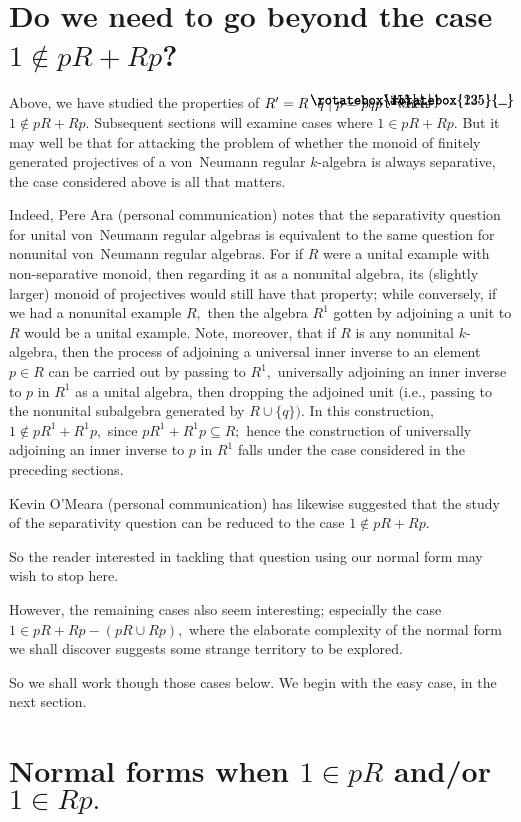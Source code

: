 \documentclass{amsart}
\DeclareRobustCommand{\lang}{\begin{picture}(5,7)
\put(1.2,2.5){\rotatebox{45}{\line(1,0){6.0}}}
\put(1.2,2.5){\rotatebox{315}{\line(1,0){6.0}}}
\end{picture}\kern.16em}
\DeclareRobustCommand{\rang}{\kern.1em\begin{picture}(5,7)
\put(.1,2.5){\rotatebox{135}{\line(1,0){6.0}}}
\put(.1,2.5){\rotatebox{225}{\line(1,0){6.0}}}
\end{picture}}
\begin{document}
\section{Do we need to go beyond the case $1\notin pR+Rp$?}\label{S.enough?}

Above, we have studied the properties of
$R'=R\lang q\mid p=pqp\rang$ when $1\notin pR+Rp.$
Subsequent sections will examine cases where $1\in pR+Rp.$
But it may well be that for attacking the problem of
whether the monoid of finitely generated projectives of
a von~Neumann regular $\!k\!$-algebra is always separative,
the case considered above is all that matters.

Indeed, Pere Ara (personal communication) notes that the
separativity question for unital von~Neumann regular algebras
is equivalent to the same question for nonunital
von~Neumann regular algebras.
For if $R$ were a unital example with non-separative monoid, then
regarding it as a nonunital algebra, its (slightly larger) monoid of
projectives would still have that property; while conversely,
if we had a nonunital example $R,$ then the algebra
$R^1$ gotten by adjoining a unit to $R$ would be a unital example.
Note, moreover, that if $R$ is any nonunital $\!k\!$-algebra, then the
process of adjoining a universal inner inverse to an element $p\in R$
can be carried out by passing to $R^1,$ universally adjoining an inner
inverse to $p$ in $R^1$ as a unital algebra,
then dropping the adjoined unit (i.e., passing to the
nonunital subalgebra generated by $R\cup\{q\}).$
In this construction, $1\notin pR^1 + R^1p,$
since $pR^1 + R^1p\subseteq R;$ hence the construction of
universally adjoining an inner inverse to $p$ in $R^1$
falls under the case considered in the preceding sections.

Kevin O'Meara (personal communication) has likewise suggested
that the study of the separativity
question can be reduced to the case $1\notin pR+Rp.$

So the reader interested in tackling that question using
our normal form may wish to stop here.

However, the remaining cases also seem interesting; especially
the case $1\in pR+Rp-(pR\cup Rp),$ where the elaborate complexity of
the normal form we shall discover suggests some strange
territory to be explored.

So we shall work though those cases below.
We begin with the easy case, in the next section.

\section{Normal forms when $1\in pR$ and/or $1\in Rp.$}\label{S.1-sided}
\end{document}
